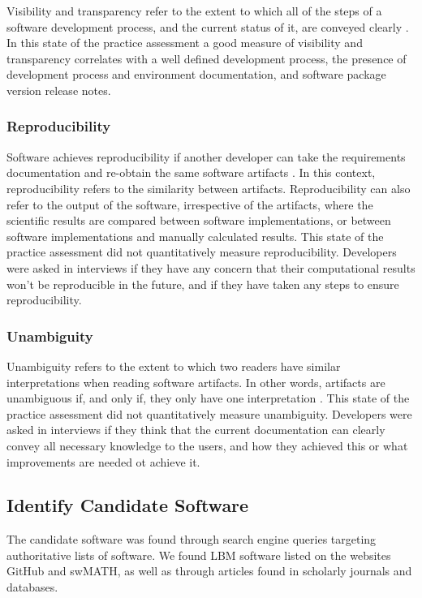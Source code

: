 \documentclass[12pt, notitlepage]{article}
\begin{document}
Visibility and transparency refer to the extent to which all of the steps of a software development process, and the current status of it, are conveyed clearly \citep{ghezzi1991fundamentals}. In this state of the practice assessment a good measure of visibility and transparency correlates with a well defined development process, the presence of development process and environment documentation, and software package version release notes. 

\subsubsection{Reproducibility}

Software achieves reproducibility if another developer can take the requirements documentation and re-obtain the same software artifacts \citep{BenureauAndRougier2017}. In this context, reproducibility refers to the similarity between artifacts. Reproducibility can also refer to the output of the software, irrespective of the artifacts, where the scientific results are compared between software implementations, or between software implementations and manually calculated results. This state of the practice assessment did not quantitatively measure reproducibility. Developers were asked in interviews if they have any concern that their computational results won’t be reproducible in the future, and if they have taken any steps to ensure reproducibility.

\subsubsection{Unambiguity}

Unambiguity refers to the extent to which two readers have similar interpretations when reading software artifacts. In other words, artifacts are unambiguous if, and only if, they only have one interpretation \citep{IEEE1998}. This state of the practice assessment did not quantitatively measure unambiguity. Developers were asked in interviews if they think that the current documentation can clearly convey all necessary knowledge to the users, and how they achieved this or what improvements are needed ot achieve it.

\subsection{Identify Candidate Software}\label{identifysoftware}

The candidate software was found through search engine queries targeting authoritative lists of software. We found LBM software listed on the websites GitHub and swMATH, as well as through articles found in scholarly journals and databases. 
\end{document}
